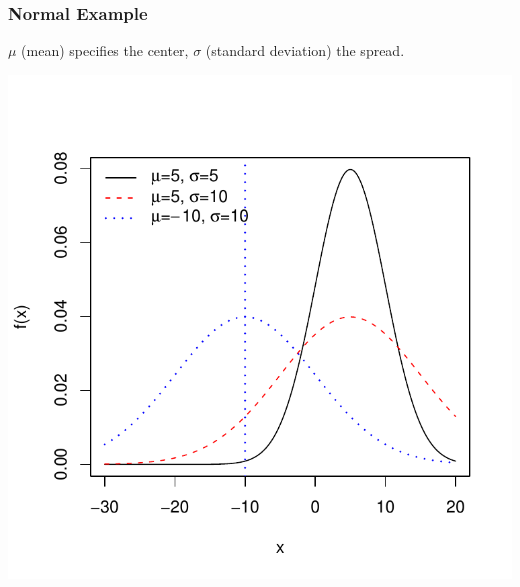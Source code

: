 \documentclass[handout]{beamer}
\begin{document}
\begin{frame}
\frametitle{Normal Example}
$\mu$ (mean) specifies the center, $\sigma$ (standard deviation) the spread.
\begin{center}
\includegraphics{figure/lec02-005}
\end{center}
\end{frame}
\end{document}

